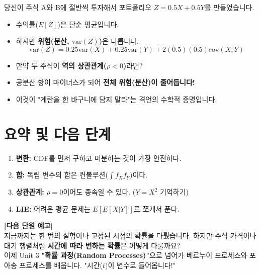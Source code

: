 \documentclass[11pt,a4paper]{book}
\theoremstyle{definition}
\begin{document}
\begin{storybox}[title={주식 분산 투자의 원리}]
당신이 주식 A와 B에 절반씩 투자해서 포트폴리오 $Z = 0.5X + 0.5Y$를 만들었습니다.
\begin{itemize}
    \item 수익률($E[Z]$)은 단순 평균입니다.
    \item 하지만 \textbf{위험(분산, $\text{var}(Z)$)}은 다릅니다.
    \[ \text{var}(Z) = 0.25\text{var}(X) + 0.25\text{var}(Y) + 2(0.5)(0.5)\text{cov}(X,Y) \]
    \item 만약 두 주식이 \textbf{역의 상관관계($\rho < 0$)}라면?
    \item 공분산 항이 마이너스가 되어 \textbf{전체 위험(분산)이 줄어듭니다!}
    \item 이것이 "계란을 한 바구니에 담지 말라"는 격언의 수학적 증명입니다.
\end{itemize}
\end{storybox}

\section{요약 및 다음 단계}

\begin{tcolorbox}[colback=mainblue!10, colframe=mainblue, title={\textbf{📝 Unit 2-3 핵심 요약}}]
\begin{enumerate}
    \item \textbf{변환:} CDF를 먼저 구하고 미분하는 것이 가장 안전하다.
    \item \textbf{합:} 독립 변수의 합은 컨볼루션($\int f_X f_Y$)이다.
    \item \textbf{상관관계:} $\rho=0$이어도 종속일 수 있다. ($Y=X^2$ 기억하기)
    \item \textbf{LIE:} 어려운 평균 문제는 $E[E[X|Y]]$로 쪼개서 푼다.
\end{enumerate}
\end{tcolorbox}

\vspace{0.5cm}
\textbf{[다음 단원 예고]} \\
지금까지는 한 번의 실험이나 고정된 시점의 확률을 다뤘습니다. 하지만 주식 가격이나 대기 행렬처럼 \textbf{시간에 따라 변하는 확률}은 어떻게 다룰까요? \\
이제 Unit 3 \textbf{"확률 과정(Random Processes)"}으로 넘어가 베르누이 프로세스와 포아송 프로세스를 배웁니다. "시간($t$)이 변수로 들어옵니다!"
\end{document}
